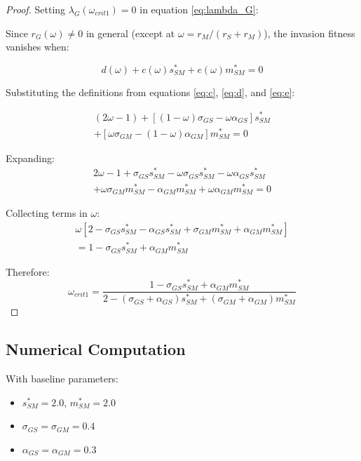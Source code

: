 \documentclass[11pt]{article}
\begin{document}
\begin{proof}
Setting $\lambda_G(\omega_{crit1}) = 0$ in equation \eqref{eq:lambda_G}:

Since $r_G(\omega) \neq 0$ in general (except at $\omega = r_M/(r_S + r_M)$), the invasion fitness vanishes when:

\begin{equation}
d(\omega) + c(\omega) s^*_{SM} + e(\omega) m^*_{SM} = 0
\end{equation}

Substituting the definitions from equations \eqref{eq:c}, \eqref{eq:d}, and \eqref{eq:e}:

\begin{multline}
(2\omega - 1) + [(1-\omega)\sigma_{GS} - \omega\alpha_{GS}] s^*_{SM} \\
+ [\omega\sigma_{GM} - (1-\omega)\alpha_{GM}] m^*_{SM} = 0
\end{multline}

Expanding:
\begin{multline}
2\omega - 1 + \sigma_{GS} s^*_{SM} - \omega\sigma_{GS} s^*_{SM} - \omega\alpha_{GS} s^*_{SM} \\
+ \omega\sigma_{GM} m^*_{SM} - \alpha_{GM} m^*_{SM} + \omega\alpha_{GM} m^*_{SM} = 0
\end{multline}

Collecting terms in $\omega$:
\begin{multline}
\omega \left[2 - \sigma_{GS} s^*_{SM} - \alpha_{GS} s^*_{SM} + \sigma_{GM} m^*_{SM} + \alpha_{GM} m^*_{SM}\right] \\
= 1 - \sigma_{GS} s^*_{SM} + \alpha_{GM} m^*_{SM}
\end{multline}

Therefore:
\begin{equation}
\omega_{crit1} = \frac{1 - \sigma_{GS} s^*_{SM} + \alpha_{GM} m^*_{SM}}{2 - (\sigma_{GS} + \alpha_{GS}) s^*_{SM} + (\sigma_{GM} + \alpha_{GM}) m^*_{SM}}
\end{equation}
\end{proof}

\subsection{Numerical Computation}

With baseline parameters:
\begin{itemize}
    \item $s^*_{SM} = 2.0$, $m^*_{SM} = 2.0$
    \item $\sigma_{GS} = \sigma_{GM} = 0.4$
    \item $\alpha_{GS} = \alpha_{GM} = 0.3$
\end{itemize}
\end{document}
